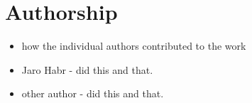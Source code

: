 \section{Authorship}

\begin{itemize}
  \item how the individual authors contributed to the work
  \item Jaro Habr - did this and that.
  \item other author - did this and that.
\end{itemize}